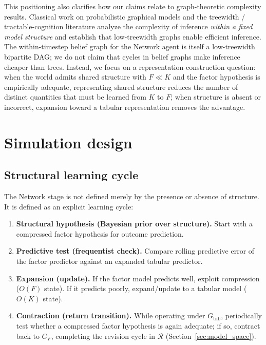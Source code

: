 \documentclass[11pt]{article}
\begin{document}
This positioning also clarifies how our claims relate to graph-theoretic complexity results.
Classical work on probabilistic graphical models \cite{Pearl1988} and the treewidth / tractable-cognition literature \cite{vanRooij2008,Kwisthout2010} analyze the complexity of inference \emph{within a fixed model structure} and establish that low-treewidth graphs enable efficient inference.
The within-timestep belief graph for the Network agent is itself a low-treewidth bipartite DAG; we do not claim that cycles in belief graphs make inference cheaper than trees.
Instead, we focus on a representation-construction question: when the world admits shared structure with $F\ll K$ and the factor hypothesis is empirically adequate, representing shared structure reduces the number of distinct quantities that must be learned from $K$ to $F$; when structure is absent or incorrect, expansion toward a tabular representation removes the advantage.



\section{Simulation design}

\subsection{Structural learning cycle}\label{sec:slc}

The Network stage is not defined merely by the presence or absence of structure.
It is defined as an explicit learning cycle:
\begin{enumerate}[leftmargin=*]
  \item \textbf{Structural hypothesis (Bayesian prior over structure).}
  Start with a compressed factor hypothesis for outcome prediction.

  \item \textbf{Predictive test (frequentist check).}
  Compare rolling predictive error of the factor predictor against an expanded
  tabular predictor.

  \item \textbf{Expansion (update).}
  If the factor model predicts well, exploit compression ($O(F)$ state).
  If it predicts poorly, expand/update to a tabular model ($O(K)$ state).

  \item \textbf{Contraction (return transition).}
  While operating under $G_{\mathrm{tab}}$, periodically test whether a
  compressed factor hypothesis is again adequate; if so, contract back to
  $G_F$, completing the revision cycle in $\mathcal{R}$
  (Section~\ref{sec:model_space}).
\end{enumerate}
\end{document}
